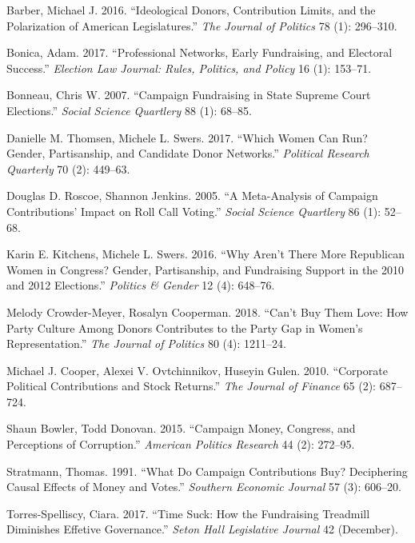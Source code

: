 \documentclass[11pt,]{article}
\begin{document}
\leavevmode\hypertarget{ref-barber2016}{}%
Barber, Michael J. 2016. ``Ideological Donors, Contribution Limits, and
the Polarization of American Legislatures.'' \emph{The Journal of
Politics} 78 (1): 296--310.

\leavevmode\hypertarget{ref-bonica2017}{}%
Bonica, Adam. 2017. ``Professional Networks, Early Fundraising, and
Electoral Success.'' \emph{Election Law Journal: Rules, Politics, and
Policy} 16 (1): 153--71.

\leavevmode\hypertarget{ref-bonneau2007}{}%
Bonneau, Chris W. 2007. ``Campaign Fundraising in State Supreme Court
Elections.'' \emph{Social Science Quartlery} 88 (1): 68--85.

\leavevmode\hypertarget{ref-thomsen2017}{}%
Danielle M. Thomsen, Michele L. Swers. 2017. ``Which Women Can Run?
Gender, Partisanship, and Candidate Donor Networks.'' \emph{Political
Research Quarterly} 70 (2): 449--63.

\leavevmode\hypertarget{ref-roscoe2005}{}%
Douglas D. Roscoe, Shannon Jenkins. 2005. ``A Meta-Analysis of Campaign
Contributions' Impact on Roll Call Voting.'' \emph{Social Science
Quartlery} 86 (1): 52--68.

\leavevmode\hypertarget{ref-kitchens2016}{}%
Karin E. Kitchens, Michele L. Swers. 2016. ``Why Aren't There More
Republican Women in Congress? Gender, Partisanship, and Fundraising
Support in the 2010 and 2012 Elections.'' \emph{Politics \& Gender} 12
(4): 648--76.

\leavevmode\hypertarget{ref-crowder-meyer2018}{}%
Melody Crowder-Meyer, Rosalyn Cooperman. 2018. ``Can't Buy Them Love:
How Party Culture Among Donors Contributes to the Party Gap in Women's
Representation.'' \emph{The Journal of Politics} 80 (4): 1211--24.

\leavevmode\hypertarget{ref-cooper2010}{}%
Michael J. Cooper, Alexei V. Ovtchinnikov, Huseyin Gulen. 2010.
``Corporate Political Contributions and Stock Returns.'' \emph{The
Journal of Finance} 65 (2): 687--724.

\leavevmode\hypertarget{ref-bowler2015}{}%
Shaun Bowler, Todd Donovan. 2015. ``Campaign Money, Congress, and
Perceptions of Corruption.'' \emph{American Politics Research} 44 (2):
272--95.

\leavevmode\hypertarget{ref-stratmann1991}{}%
Stratmann, Thomas. 1991. ``What Do Campaign Contributions Buy?
Deciphering Causal Effects of Money and Votes.'' \emph{Southern Economic
Journal} 57 (3): 606--20.

\leavevmode\hypertarget{ref-torres-spelliscy2017}{}%
Torres-Spelliscy, Ciara. 2017. ``Time Suck: How the Fundraising
Treadmill Diminishes Effetive Governance.'' \emph{Seton Hall Legislative
Journal} 42 (December).
\end{document}
